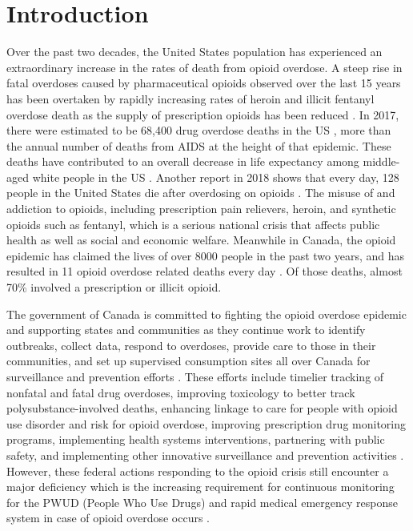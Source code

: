 \documentclass[conference]{IEEEtran}
\begin{document}
\section{Introduction}
Over the past two decades, the United States population has experienced an extraordinary increase in the rates of death from opioid overdose. A steep rise in fatal overdoses caused by pharmaceutical opioids observed over the last 15 years \cite{b1} has been overtaken by rapidly increasing rates of heroin and illicit fentanyl overdose death as the supply of prescription opioids has been reduced \cite{b2}. In 2017, there were estimated to be 68,400 drug overdose deaths in the US \cite{b3}, more than the annual number of deaths from AIDS at the height of that epidemic. These deaths have contributed to an overall decrease in life expectancy among middle-aged white people in the US \cite{b4}. Another report in 2018 shows that every day, 128 people in the United States die after overdosing on opioids \cite{b5}. The misuse of and addiction to opioids, including prescription pain relievers, heroin, and synthetic opioids such as fentanyl, which is a serious national crisis that affects public health as well as social and economic welfare. Meanwhile in Canada, the opioid epidemic has claimed the lives of over 8000 people in the past two years, and has resulted in 11 opioid overdose related deaths every day \cite{b6}. Of those deaths, almost 70\% involved a prescription or illicit opioid.

The government of Canada is committed to fighting the opioid overdose epidemic and supporting states and communities as they continue work to identify outbreaks, collect data, respond to overdoses, provide care to those in their communities, and set up supervised consumption sites all over Canada for surveillance and prevention efforts \cite{b7}. These efforts include timelier tracking of nonfatal and fatal drug overdoses, improving toxicology to better track polysubstance-involved deaths, enhancing linkage to care for people with opioid use disorder and risk for opioid overdose, improving prescription drug monitoring programs, implementing health systems interventions, partnering with public safety, and implementing other innovative surveillance and prevention activities \cite{b8}. However, these federal actions responding to the opioid crisis still encounter a major deficiency which is the increasing requirement for continuous monitoring for the PWUD (People Who Use Drugs) and rapid medical emergency response system in case of opioid overdose occurs \cite{b9}.
\end{document}
